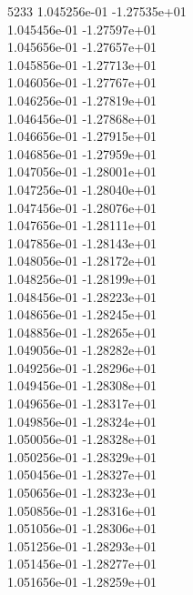 5233	1.045256e-01	-1.27535e+01	\\ 	1.045456e-01	-1.27597e+01	\\ 	1.045656e-01	-1.27657e+01	\\ 	1.045856e-01	-1.27713e+01	\\ 	1.046056e-01	-1.27767e+01	\\ 	1.046256e-01	-1.27819e+01	\\ 	1.046456e-01	-1.27868e+01	\\ 	1.046656e-01	-1.27915e+01	\\ 	1.046856e-01	-1.27959e+01	\\ 	1.047056e-01	-1.28001e+01	\\ 	1.047256e-01	-1.28040e+01	\\ 	1.047456e-01	-1.28076e+01	\\ 	1.047656e-01	-1.28111e+01	\\ 	1.047856e-01	-1.28143e+01	\\ 	1.048056e-01	-1.28172e+01	\\ 	1.048256e-01	-1.28199e+01	\\ 	1.048456e-01	-1.28223e+01	\\ 	1.048656e-01	-1.28245e+01	\\ 	1.048856e-01	-1.28265e+01	\\ 	1.049056e-01	-1.28282e+01	\\ 	1.049256e-01	-1.28296e+01	\\ 	1.049456e-01	-1.28308e+01	\\ 	1.049656e-01	-1.28317e+01	\\ 	1.049856e-01	-1.28324e+01	\\ 	1.050056e-01	-1.28328e+01	\\ 	1.050256e-01	-1.28329e+01	\\ 	1.050456e-01	-1.28327e+01	\\ 	1.050656e-01	-1.28323e+01	\\ 	1.050856e-01	-1.28316e+01	\\ 	1.051056e-01	-1.28306e+01	\\ 	1.051256e-01	-1.28293e+01	\\ 	1.051456e-01	-1.28277e+01	\\ 	1.051656e-01	-1.28259e+01	\\ \hline
